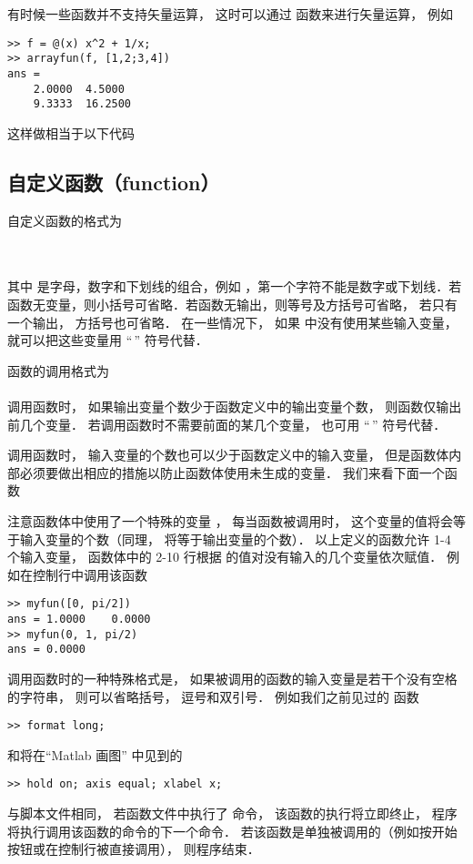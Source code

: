 有时候一些函数并不支持矢量运算， 这时可以通过  函数来进行矢量运算， 例如
\begin{lstlisting}[language=MatlabCom]
>> f = @(x) x^2 + 1/x;
>> arrayfun(f, [1,2;3,4])
ans =
    2.0000  4.5000
    9.3333  16.2500
\end{lstlisting}
这样做相当于以下代码


\subsection{自定义函数（function）}
自定义函数的格式为\\
\\
\\

其中  是字母，数字和下划线的组合，例如 ，第一个字符不能是数字或下划线．若函数无变量，则小括号可省略．若函数无输出，则等号及方括号可省略， 若只有一个输出， 方括号也可省略． 在一些情况下， 如果  中没有使用某些输入变量， 就可以把这些变量用 “\;\,\x{\~}” 符号代替．

函数的调用格式为\\
\\
调用函数时， 如果输出变量个数少于函数定义中的输出变量个数， 则函数仅输出前几个变量． 若调用函数时不需要前面的某几个变量， 也可用 “\;\,\x{\~}” 符号代替．

调用函数时， 输入变量的个数也可以少于函数定义中的输入变量， 但是函数体内部必须要做出相应的措施以防止函数体使用未生成的变量． 我们来看下面一个函数


注意函数体中使用了一个特殊的变量 ， 每当函数被调用时， 这个变量的值将会等于输入变量的个数（同理，  将等于输出变量的个数）． 以上定义的函数允许 1-4 个输入变量， 函数体中的 2-10 行根据  的值对没有输入的几个变量依次赋值． 例如在控制行中调用该函数
\begin{lstlisting}[language=MatlabCom]
>> myfun([0, pi/2])
ans = 1.0000    0.0000
>> myfun(0, 1, pi/2)
ans = 0.0000
\end{lstlisting}

调用函数时的一种特殊格式是， 如果被调用的函数的输入变量是若干个没有空格的字符串， 则可以省略括号， 逗号和双引号． 例如我们之前见过的  函数
\begin{lstlisting}[language=MatlabCom]
>> format long;
\end{lstlisting}
和将在“Matlab 画图” 中见到的
\begin{lstlisting}[language=MatlabCom]
>> hold on; axis equal; xlabel x;
\end{lstlisting}

与脚本文件相同， 若函数文件中执行了  命令， 该函数的执行将立即终止， 程序将执行调用该函数的命令的下一个命令． 若该函数是单独被调用的（例如按开始按钮或在控制行被直接调用）， 则程序结束．
